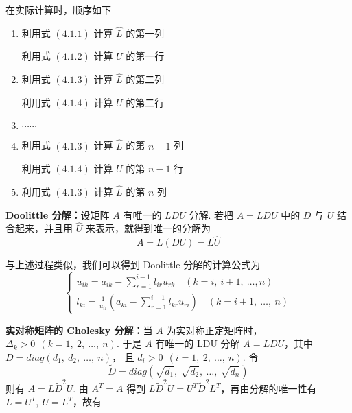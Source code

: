             \par 在实际计算时，顺序如下
            \begin{enumerate}
                \item 利用式 $(4.1.1)$ 计算 $\hat{L}$ 的第一列
                    \par 利用式 $(4.1.2)$ 计算 $U$ 的第一行
                \item 利用式 $(4.1.3)$ 计算 $\hat{L}$ 的第二列
                    \par 利用式 $(4.1.4)$ 计算 $U$ 的第二行 
                \item $\cdots \cdots$
                \item 利用式 $(4.1.3)$ 计算 $\hat{L}$ 的第 $n-1$ 列
                    \par 利用式 $(4.1.4)$ 计算 $U$ 的第 $n-1$ 行
                \item 利用式 $(4.1.3)$ 计算 $\hat{L}$ 的第 $n$ 列
            \end{enumerate} 
            \par \textbf{Doolittle 分解：}设矩阵 $A$ 有唯一的 $LDU$ 分解. 若把 $A = LDU$ 中的 $D$ 与 $U$ 结合起来，并且用 $\hat{U}$ 来表示，就得到唯一的分解为
            \begin{equation*}
                A = L(DU) = L \hat{U}
            \end{equation*}
            \par 与上述过程类似，我们可以得到 Doolittle 分解的计算公式为
            \begin{equation*}
                \begin{cases*}
                    u_{ik} = a_{ik} - \sum_{r=1}^{i-1}l_{ir}u_{rk} \quad (k = i, \ i + 1, \ \dots, n) \\
                    l_{ki} = \frac{1}{u_{ii}}(a_{ki} - \sum_{r=1}^{i-1}l_{kr}u_{ri}) \quad (k = i + 1, \ \dots, \ n)
                \end{cases*}
            \end{equation*}
            \par \textbf{实对称矩阵的 Cholesky 分解：}当 $A$ 为实对称正定矩阵时，$\Delta_k > 0 \ \ (k = 1, \ 2, \ \dots, \ n)$. 于是 $A$ 有唯一的 LDU 分解 $A = LDU$，其中 $D = diag(d_1, \ d_2, \ \dots, \ n)$， 且 $d_i > 0 \ \ (i = 1, \ 2, \ \dots, \ n)$. 令
            \begin{equation*}
                \widetilde{D} = diag(\sqrt{d_1}, \ \sqrt{d_2}, \ \dots, \ \sqrt{d_n})
            \end{equation*}
            则有 $A = L\widetilde{D}^2U$. 由 $A^T = A$ 得到 $L\widetilde{D}^2U = U^T\widetilde{D}^2L^T$，再由分解的唯一性有 $L = U^T, \ U = L^T$，故有
